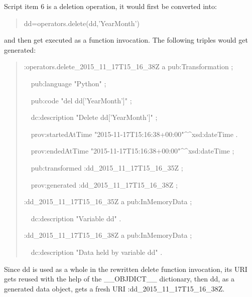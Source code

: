 Script item 6 is a deletion operation, it would first be converted into:
\begin{quotation}
	\noindent dd=operators.delete(dd,'YearMonth')
\end{quotation}
and then get executed as a function invocation. The following triples would get generated:
\begin{quotation}
	\noindent :operators.delete\_2015\_11\_17T15\_16\_38Z a pub:Transformation ;
	
	\noindent\ \ pub:language "Python" ;
	
	\noindent\ \ pub:code "del dd['YearMonth']" ;
	
	\noindent\ \ dc:description "Delete dd['YearMonth']" ;
	
	\noindent\ \ prov:startedAtTime "2015-11-17T15:16:38+00:00"\^{}\^{}xsd:dateTime .
	
	\noindent\ \ prov:endedAtTime "2015-11-17T15:16:38+00:00"\^{}\^{}xsd:dateTime ;
	
	\noindent\ \ pub:transformed :dd\_2015\_11\_17T15\_16\_35Z ;
	
	\noindent\ \ prov:generated :dd\_2015\_11\_17T15\_16\_38Z ;
	
	\noindent:dd\_2015\_11\_17T15\_16\_35Z a pub:InMemoryData ;

	\noindent\ \ dc:description "Variable dd" .

	\noindent:dd\_2015\_11\_17T15\_16\_38Z a pub:InMemoryData ;
	
	\noindent\ \ dc:description "Data held by variable dd" .
\end{quotation}
Since dd is used as a whole in the rewritten delete function invocation, its URI gets reused with the help of the \_\_OBJDICT\_\_ dictionary, then dd, as a generated data object, gets a fresh URI :dd\_2015\_11\_17T15\_16\_38Z.

